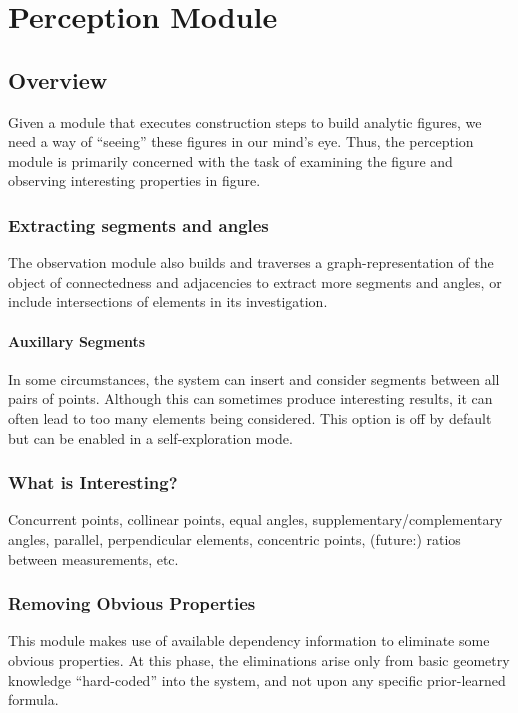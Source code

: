 \chapter{Perception Module}
\label{chap:observer}

\section{Overview}

Given a module that executes construction steps to build analytic
figures, we need a way of ``seeing'' these figures in our mind's eye.
Thus, the perception module is primarily concerned with the task of
examining the figure and observing interesting properties in figure.

\subsection{Extracting segments and angles}

The observation module also builds and traverses a
graph-representation of the object of connectedness and adjacencies to
extract more segments and angles, or include intersections of elements
in its investigation.

\subsubsection{Auxillary Segments}

In some circumstances, the system can insert and consider segments
between all pairs of points. Although this can sometimes produce
interesting results, it can often lead to too many elements being
considered. This option is off by default but can be enabled in a
self-exploration mode.

\subsection{What is Interesting?}

Concurrent points, collinear points, equal angles,
supplementary/complementary angles, parallel, perpendicular elements,
concentric points, (future:) ratios between measurements, etc.

\subsection{Removing Obvious Properties}

This module makes use of available dependency information to eliminate
some obvious properties. At this phase, the eliminations arise only
from basic geometry knowledge ``hard-coded'' into the system, and not
upon any specific prior-learned formula.


